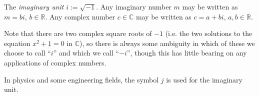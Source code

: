 \documentclass[12pt]{article}
\newcommand{\reals}{\mathbb{R}}
\newcommand{\complexes}{\mathbb{C}}
\newcommand{\defined}{:=}
\begin{document}
The \emph{imaginary unit} $i \defined \sqrt{-1}$.  Any imaginary number $m$ may be written as $m = b i$, $b \in \reals$.  Any complex number $c \in \complexes$ may be written as $c = a + b i$, $a,b \in \reals$.

Note that there are two complex square roots of $-1$ (i.e. the two solutions to the equation $x^2+1=0$ in $\mathbb{C}$), so there is always some ambiguity in which of these we choose to call ``$i$'' and which we call ``$-i$'', though this has little bearing on any applications of complex numbers.

In physics and some engineering fields, the symbol $j$ is used for the imaginary unit.

\end{document}
